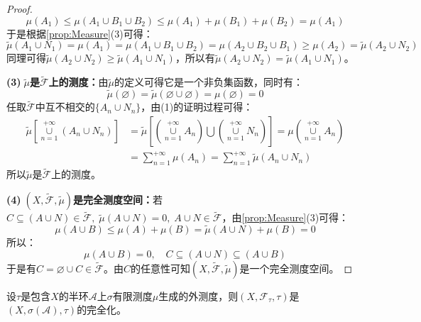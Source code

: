 \begin{proof}
	\begin{equation*}
		\mu(A_1)\leqslant\mu(A_1\cup B_1\cup B_2)\leqslant\mu(A_1)+\mu(B_1)+\mu(B_2)=\mu(A_1)
	\end{equation*}
	于是根据\cref{prop:Measure}(3)可得：
	\begin{equation*}
		\tilde{\mu}(A_1\cup N_1)=\mu(A_1)=\mu(A_1\cup B_1\cup B_2)=\mu(A_2\cup B_2\cup B_1)\geqslant\mu(A_2)=\tilde{\mu}(A_2\cup N_2)
	\end{equation*}
	同理可得$\tilde{\mu}(A_2\cup N_2)\geqslant\tilde{\mu}(A_1\cup N_1)$，所以有$\tilde{\mu}(A_2\cup N_2)=\tilde{\mu}(A_1\cup N_1)$。\par
	\textbf{(3)$\;\tilde{\mu}$是$\tilde{\mathscr{F}}$上的测度：}由$\tilde{\mu}$的定义可得它是一个非负集函数，同时有：
	\begin{equation*}
		\tilde{\mu}(\varnothing)=\tilde{\mu}(\varnothing\cup\varnothing)=\mu(\varnothing)=0
	\end{equation*}
	任取$\tilde{\mathscr{F}}$中互不相交的$\{A_n\cup N_n\}$，由(1)的证明过程可得：
	\begin{align*}
		\tilde{\mu}\left[\underset{n=1}{\overset{+\infty}{\cup}}(A_n\cup N_n)\right]&=\tilde{\mu}\left[\left(\underset{n=1}{\overset{+\infty}{\cup}}A_n\right)\bigcup\left(\underset{n=1}{\overset{+\infty}{\cup}}N_n\right)\right]=\mu\left(\underset{n=1}{\overset{+\infty}{\cup}}A_n\right) \\
		&=\sum_{n=1}^{+\infty}\mu(A_n)=\sum_{n=1}^{+\infty}\tilde{\mu}(A_n\cup N_n)
	\end{align*}
	所以$\tilde{\mu}$是$\tilde{\mathscr{F}}$上的测度。\par
	\textbf{(4)$\;(X,\tilde{\mathscr{F}},\tilde{\mu})$是完全测度空间：}若$C\subseteq(A\cup N)\in\tilde{\mathscr{F}},\;\tilde{\mu}(A\cup N)=0,\;A\cup N\in\tilde{\mathscr{F}}$，由\cref{prop:Measure}(3)可得：
	\begin{equation*}
		\mu(A\cup B)\leqslant\mu(A)+\mu(B)=\tilde{\mu}(A\cup N)+\mu(B)=0
	\end{equation*}
	所以：
	\begin{equation*}
		\mu(A\cup B)=0,\quad C\subseteq(A\cup N)\subseteq(A\cup B)
	\end{equation*}
	于是有$C=\varnothing\cup C\in\tilde{\mathscr{F}}$。由$C$的任意性可知$(X,\tilde{\mathscr{F}},\tilde{\mu})$是一个完全测度空间。
\end{proof}
\begin{theorem}
	设$\tau$是包含$X$的半环$\mathscr{A}$上$\sigma$有限测度$\mu$生成的外测度，则$(X,\mathscr{F}_\tau,\tau)$是$(X,\sigma(\mathscr{A}),\tau)$的完全化。
\end{theorem}
